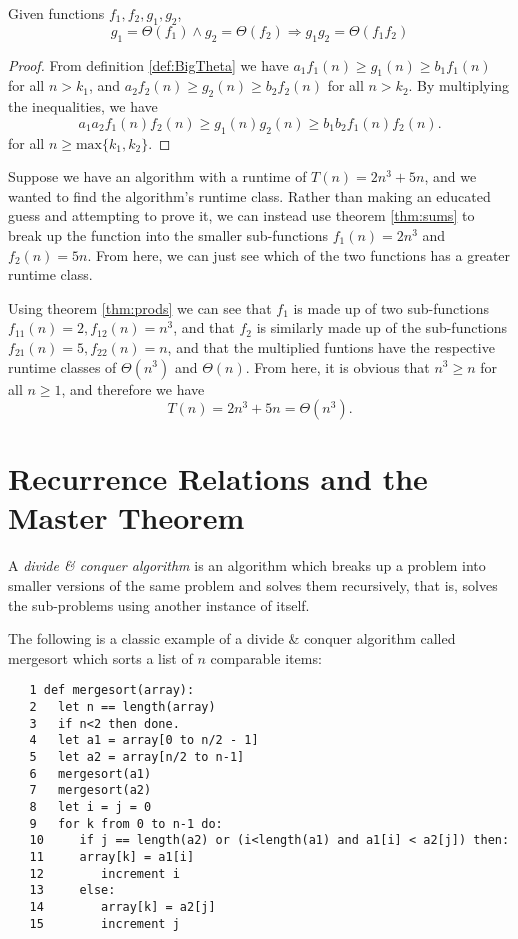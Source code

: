 \documentclass{article}
\begin{document}
 \begin{theorem}\label{thm:prods}
  Given functions $f_1,f_2,g_1,g_2$,
  $$ g_1=\Theta(f_1) \land g_2=\Theta(f_2) \Longrightarrow g_1g_2 = \Theta(f_1f_2) $$
 \end{theorem}
 \begin{proof}
  From definition \ref{def:BigTheta} we have $a_1f_1(n) \geq g_1(n) \geq b_1f_1(n)$ for all $n>k_1$, and $a_2f_2(n) \geq g_2(n) \geq b_2f_2(n)$ for all $n>k_2$. By multiplying the inequalities, we have
  $$ a_1a_2f_1(n)f_2(n) \geq g_1(n)g_2(n) \geq b_1b_2f_1(n)f_2(n). $$
  for all $n \geq \text{max}\{k_1,k_2\}$.
 \end{proof}

 \begin{example}\label{ex:3}
  Suppose we have an algorithm with a runtime of $T(n) = 2n^3 + 5n$, and we wanted to find the algorithm's runtime class. Rather than making an educated guess and attempting to prove it, we can instead use theorem \ref{thm:sums} to break up the function into the smaller sub-functions $f_1(n)=2n^3$ and $f_2(n)=5n$. From here, we can just see which of the two functions has a greater runtime class.

  Using theorem \ref{thm:prods} we can see that $f_1$ is made up of two sub-functions $f_11(n) = 2, f_12(n) = n^3$, and that $f_2$ is similarly made up of the sub-functions $f_21(n) = 5, f_22(n) = n$, and that the multiplied funtions have the respective runtime classes of $\Theta(n^3)$ and $\Theta(n)$. From here, it is obvious that $n^3 \geq n$ for all $n \geq 1$, and therefore we have
  $$ T(n) = 2n^3 + 5n = \Theta(n^3). $$
 \end{example}


 \section{Recurrence Relations and the Master Theorem}

 \begin{definition}\label{def:d&c}
  A \emph{divide \& conquer algorithm} is an algorithm which breaks up a problem into smaller versions of the same problem and solves them recursively, that is, solves the sub-problems using another instance of itself.\cite{roughgarden22}
 \end{definition}
 \begin{example}\label{ex:4}
  The following is a classic example of a divide \& conquer algorithm called mergesort which sorts a list of $n$ comparable items:
  \begin{lstlisting}
   1 def mergesort(array):
   2   let n == length(array)
   3   if n<2 then done.
   4   let a1 = array[0 to n/2 - 1]
   5   let a2 = array[n/2 to n-1]
   6   mergesort(a1)
   7   mergesort(a2)
   8   let i = j = 0
   9   for k from 0 to n-1 do:
   10     if j == length(a2) or (i<length(a1) and a1[i] < a2[j]) then:
   11     array[k] = a1[i]
   12        increment i
   13     else:
   14        array[k] = a2[j]
   15        increment j
  \end{lstlisting}\cite{roughgarden22}
 \end{example}
\end{document}
